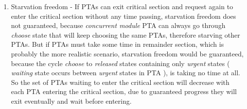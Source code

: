 \begin{enumerate}
\item Starvation freedom - If PTAs can exit critical section and request again to enter the critical section without any time passing, starvation freedom does not guaranteed, because \textit{concurrent module} PTA can always go through \textcolor{ColorUppaalState}{\textit{choose}} state that will keep choosing the same PTAs, therefore starving other PTAs. But if PTAs must take some time in remainder section, which is probably the more realistic scenario, starvation freedom would be guaranteed, because the cycle \textcolor{ColorUppaalState}{\textit{choose}} to \textcolor{ColorUppaalState}{\textit{released}} states containing only \textit{urgent} states ( \textcolor{ColorUppaalState}{\textit{waiting}} state occurs between \textit{urgent} states in PTA ), is taking no time at all. So the set of PTAs waiting to enter the critical section will decrease with each PTA entering the critical section, due to guaranteed progress they will exit eventually and wait before entering.
\end{enumerate}
